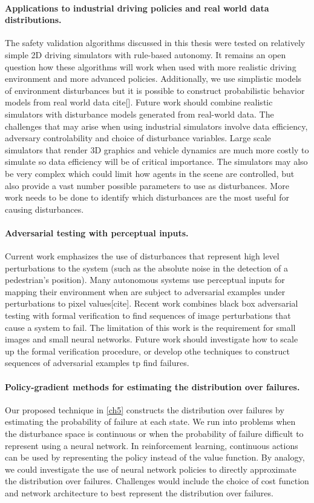 \paragraph{Applications to industrial driving policies and real world data distributions.} The safety validation algorithms discussed in this thesis were tested on relatively simple 2D driving simulators with rule-based autonomy. It remains an open question how these algorithms will work when used with more realistic driving environment and more advanced policies. Additionally, we use simplistic models of environment disturbances but it is possible to construct probabilistic behavior models from real world data cite[]. Future work should combine realistic simulators with disturbance models generated from real-world data. The challenges that may arise when using industrial simulators involve data efficiency, adversary controlability and choice of disturbance variables. Large scale simulators that render 3D graphics and vehicle dynamics are much more costly to simulate so data efficiency will be of critical importance. The simulators may also be very complex which could limit how agents in the scene are controlled, but also provide a vast number possible parameters to use as disturbances. More work needs to be done to identify which disturbances are the most useful for causing disturbances. 

\paragraph{Adversarial testing with perceptual inputs.} Current work emphasizes the use of disturbances that represent high level perturbations to the system (such as the absolute noise in the detection of a pedestrian's position). Many autonomous systems use perceptual inputs for mapping their environment when are subject to adversarial examples under perturbations to pixel values[cite]. Recent work\cite{julian2020validation} combines black box adversarial testing with formal verification to find sequences of image perturbations that cause a system to fail. The limitation of this work is the requirement for small images and small neural networks. Future work should investigate how to scale up the formal verification procedure, or develop othe techniques to construct sequences of adversarial examples tp find failures. 


\paragraph{Policy-gradient methods for estimating the distribution over failures.} Our proposed technique in \cref{ch5} constructs the distribution over failures by estimating the probability of failure at each state. We run into problems when the disturbance space is continuous or when the probability of failure difficult to represent using a neural network. In reinforcement learning, continuous actions can be used by representing the policy instead of the value function. By analogy, we could investigate the use of neural network policies to directly approximate the distribution over failures. Challenges would include the choice of cost function and network architecture to best represent the distribution over failures. 

